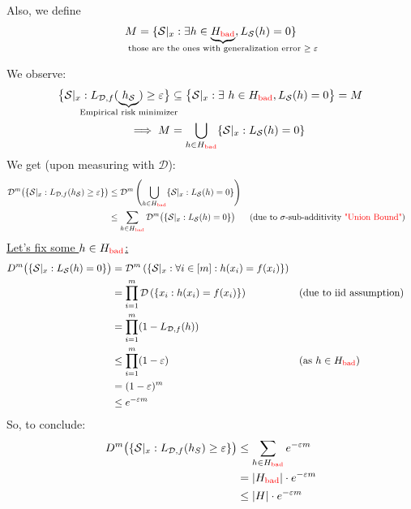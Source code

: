 \documentclass[10pt,a4paper]{article}
\theoremstyle{remark}
\theoremstyle{definition}
\theoremstyle{plain}
\begin{document}
Also, we define
\begin{align*}
	M &= \{\mathcal{S}|_x : \exists h \in \underbrace{H_{\mathrm{\textcolor{red}{bad}}}}_{
		\mathclap{  \text{ those are the ones with generalization error $\geq \varepsilon$ } }
		}, L_\mathcal{S}(h) = 0  \}\\
\end{align*}

We observe:
\begin{align*}
	\big\{\mathcal{S}|_x : L_{\mathcal{D},f}(\underbrace{h_\mathcal{S}}_{\mathclap{\text{Empirical risk minimizer}}}) \geq \varepsilon\big\} &\subseteq \big\{\mathcal{S}|_x : \exists \ h \in H_{\mathrm{\textcolor{red}{bad}}}, L_\mathcal{S}(h) = 0 \big\}= M\\
	 \implies M &= \bigcup_{h \in H_{\mathrm{\textcolor{red}{bad}}}}\{\mathcal{S}|_x: L_{\mathcal{S}}(h) = 0\}
\end{align*}
We get (upon measuring with $\mathcal{D}$):
\begin{align*}
\mathcal{D}^m \big( \{\mathcal{S}|_x : L_{\mathcal{D},f}(h_\mathcal{S}) \geq \varepsilon\}\big) &\leq \mathcal{D}^m\left( \bigcup_{h \in H_{\mathrm{\textcolor{red}{bad}}}}\{\mathcal{S}|_x : L_{\mathcal{S}}(h) = 0\} \right)\\
&\leq \sum_{h \in H_{\mathrm{\textcolor{red}{bad}}}} \mathcal{D}^m \big(\{\mathcal{S}|_x : L_{\mathcal{S}}(h) = 0\}\big) && \text{(due to $\sigma$-sub-additivity \textcolor{red}{"Union Bound"})}
\end{align*}
\underline{Let's fix some $h \in H_{\mathrm{\textcolor{red}{bad}}}$:}
\begin{align*}
	D^m \big(\{\mathcal{S}|_x : L_{\mathcal{S}}(h) = 0\}\big) 
		&= \mathcal{D}^m \left(\left\{\mathcal{S}|_x : \forall i \in [m]: h(x_i) = f(x_i)\right\}\right)\\
		&= \prod_{i = 1}^{m} \mathcal{D} \left(\{x_i: h(x_i) = f(x_i)\} \right) 	&& \text{(due to iid assumption)}\\
		&= \prod_{i=1}^{m} (1 - L_{\mathcal{D},f}(h))\\
		&\leq \prod_{i=1}^{m} (1-\varepsilon)		&& \text{(as $h \in H_{\mathrm{\textcolor{red}{bad}}}$)}\\
		&= (1-\varepsilon)^m \\
		&\leq e^{-\varepsilon m}
\end{align*}
So, to conclude:
\begin{align*}
	D^m \big(\{\mathcal{S}|_x : L_{\mathcal{D},f}(h_S) \geq \varepsilon\}\big) &\leq \sum_{h \in H_{\mathrm{\textcolor{red}{bad}}}} e^{-\varepsilon m} \\ 
	&= |H_{\mathrm{\textcolor{red}{bad}}}| \cdot e^{-\varepsilon m} \\
	&\leq |H| \cdot e^{-\varepsilon m}
\end{align*}
\end{document}
